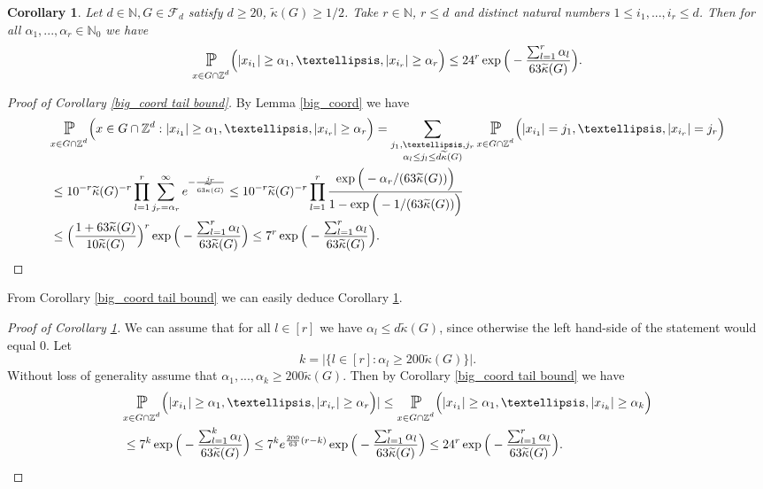 \documentclass[10pt,a4paper]{amsart}
\numberwithin{equation}{section}
\newtheorem{Cor}[Thm]{Corollary}
\newcommand{\Pro}{\mathop{\mathbb{P}}}
\newcommand{\Z}{\mathbb{Z}}
\newcommand{\N}{\mathbb{N}}
\newcommand{\spr}[1]{\underset{_{\substack{#1}}}{\mathlarger{\mathlarger{\Pro}}}}
\begin{document}
\begin{Cor} \label{big_coord tail bound no ass on alpha}
   Let $d \in \N, G \in \mathcal{F}_d$ satisfy $d \ge 20$, $\widetilde{\kappa}(G) \ge 1/2$. Take $r \in \N$, $r \le d$ and distinct natural numbers $1 \le i_1,...,i_r \le d$. Then for all $\alpha_1,...,\alpha_r \in \N_0$  we have
    \[
    \spr{x \in G \cap \Z^d} \Big( |x_{i_1}|\ge \alpha_1, \ldots,|x_{i_r}| \ge \alpha_r \Big) \le 24^r\exp\Big(- \frac{\sum_{l=1}^r\alpha_l}{63\widetilde{\kappa}(G)} \Big) .
    \]  
\end{Cor}
\begin{proof}[Proof of Corollary \ref{big_coord tail bound}]
    By Lemma \ref{big_coord} we have 
    \begin{align*}
        &\spr{x \in G \cap \Z^d} \Big( x \in G \cap \Z^d: |x_{i_1}|\ge \alpha_1, \ldots,|x_{i_r}| \ge \alpha_r \Big)= \sum_{\substack{j_1,\ldots, j_r \\
        \alpha_l \le j_l \le d \widetilde{\kappa}(G)}} \spr{x \in G \cap \Z^d} \Big( |x_{i_1}|=j_1, \ldots,|x_{i_r}|=j_r \Big) \\
        &\le 10^{-r} \widetilde{\kappa}(G)^{-r}\prod_{l=1}^r \sum_{j_r= \alpha_r}^\infty e^{- \frac{j_r}{63 \widetilde{\kappa}(G)}} \le  10^{-r} \widetilde{\kappa}(G)^{-r}\prod_{l=1}^r \frac{\exp\Big(- \alpha_r/(63 \widetilde{\kappa}(G))\Big)}{1-\exp\Big(- 1/(63 \widetilde{\kappa}(G))\Big)}\\
        &\le \Big(\frac{1+63 \widetilde{\kappa}(G)}{10 \widetilde{\kappa}(G)} \Big)^r \exp\Big(- \frac{\sum_{l=1}^r\alpha_l}{63\widetilde{\kappa}(G)} \Big)  \le 7^r \exp\Big(- \frac{\sum_{l=1}^r\alpha_l}{63\widetilde{\kappa}(G)} \Big) .
    \end{align*}
\end{proof}
From Corollary \ref{big_coord tail bound} we can easily deduce Corollary \ref{big_coord tail bound no ass on alpha}.
\begin{proof}[Proof of Corollary \ref{big_coord tail bound no ass on alpha}]
We can assume that for all $l \in [r]$ we have $\alpha_l \le d \widetilde{\kappa}(G)$, since otherwise the left hand-side of the statement would equal $0$. Let 
\[
k= \Big| \Big\{ l \in [r]: \alpha_l \ge 200 \widetilde{\kappa}(G) \Big\}\Big|.
\]
Without loss of generality assume that $\alpha_1,..., \alpha_k \ge 200 \widetilde{\kappa}(G)$. Then by Corollary \ref{big_coord tail bound} we have 
\begin{align*}
    &\spr{x \in G \cap \Z^d} \Big( |x_{i_1}|\ge \alpha_1, \ldots,|x_{i_r}| \ge \alpha_r \Big)| \le \spr{x \in G \cap \Z^d} \Big( |x_{i_1}|\ge \alpha_1, \ldots,|x_{i_k}| \ge \alpha_k \Big) \\
    &\le 7^k \exp\Big(- \frac{\sum_{l=1}^k\alpha_l}{63\widetilde{\kappa}(G)} \Big)  \le 7^k e^{\frac{200}{63}(r-k)} \exp\Big(- \frac{\sum_{l=1}^r\alpha_l}{63\widetilde{\kappa}(G)} \Big)  \le 24^r \exp\Big(- \frac{\sum_{l=1}^r\alpha_l}{63\widetilde{\kappa}(G)} \Big).
\end{align*}
\end{proof}
\end{document}
